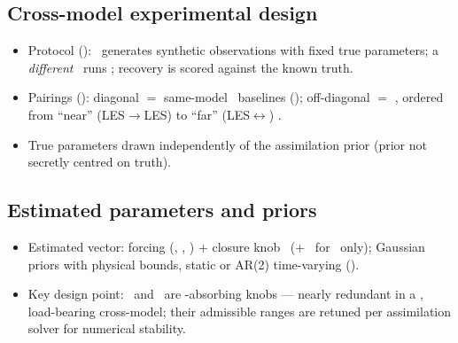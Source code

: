 \subsection{Cross-model experimental design}
\label{sec:setup:crossmodel}
\begin{itemize}
  \item Protocol (): \truthmodel\ generates
        synthetic observations with fixed true parameters; a \emph{different}
        \assimmodel\ runs \esmda; recovery is scored against the known truth.
  \item Pairings (): diagonal $=$ same-model \twinexp\
        baselines (\invcrime); off-diagonal $=$ \crossmodel, ordered from
        ``near'' (LES$\to$LES) to ``far'' (LES$\leftrightarrow$\lbmmodel)
        \discrepancy.
  \item True parameters drawn independently of the assimilation prior (prior
        not secretly centred on truth).
\end{itemize}

\begin{table}[t]
  \centering
  \caption{Truth $\times$ assimilation pairings ($3\times3$; diagonal $=$
    \twinexp\ baseline, off-diagonal $=$ \crossmodel).}
  \label{tab:pairings}
\end{table}

\subsection{Estimated parameters and priors}
\label{sec:setup:params}
\begin{itemize}
  \item Estimated vector: forcing (\inflowangle, \velmag, \shearexp) $+$
        closure knob \sgs\ ($+$ \pgrad\ for \pyudales\ only); Gaussian priors
        with physical bounds, static or AR(2) time-varying ().
  \item Key design point: \shearexp\ and \sgs\ are \discrepancy-absorbing
        knobs --- nearly redundant in a \twinexp, load-bearing cross-model;
        their admissible ranges are retuned per assimilation solver for
        numerical stability.
\end{itemize}

\begin{table}[t]
  \centering
  \caption{Parameters: priors, bounds, truth values, temporal model.}
  \label{tab:priors}
\end{table}

